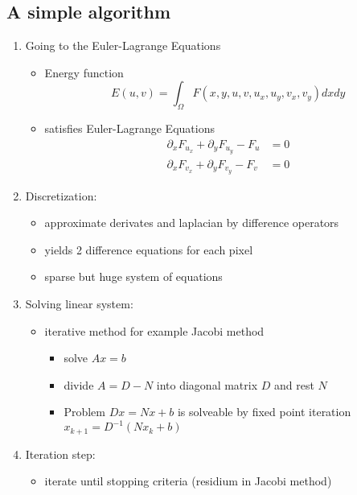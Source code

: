 \documentclass[11pt]{article}
\begin{document}
\subsection{A simple algorithm}
\label{sec-5-2}
\begin{enumerate}
\item Going to the Euler-Lagrange Equations
\begin{itemize}
\item Energy function
        \[ E(u,v) = \int_\Omega F(x,y,u,v, u_x,u_y,v_x,v_y) dxdy \]
\item satisfies Euler-Lagrange Equations
\begin{align*} \partial_x F_{u_x} + \partial_y F_{u_y} - F_u &= 0 \\
	   \partial_x F_{v_x} + \partial_y F_{v_y} - F_v &= 0 \end{align*}
\end{itemize}
\item Discretization:
\begin{itemize}
\item approximate derivates and laplacian by difference operators
\item yields 2 difference equations for each pixel
\item sparse but huge system of equations
\end{itemize}
\item Solving linear system:
\begin{itemize}
\item iterative method for example Jacobi method
\begin{itemize}
\item solve $Ax=b$
\item divide $A=D-N$  into diagonal matrix $D$ and rest $N$
\item Problem $Dx = Nx +b$ is solveable by fixed point iteration 
          $x_{k+1} = D^{-1}(Nx_k+b)$
\end{itemize}
\end{itemize}
\item Iteration step:
\begin{itemize}
\item iterate until stopping criteria (residium in Jacobi method)
\end{itemize}
\end{enumerate}
\end{document}
